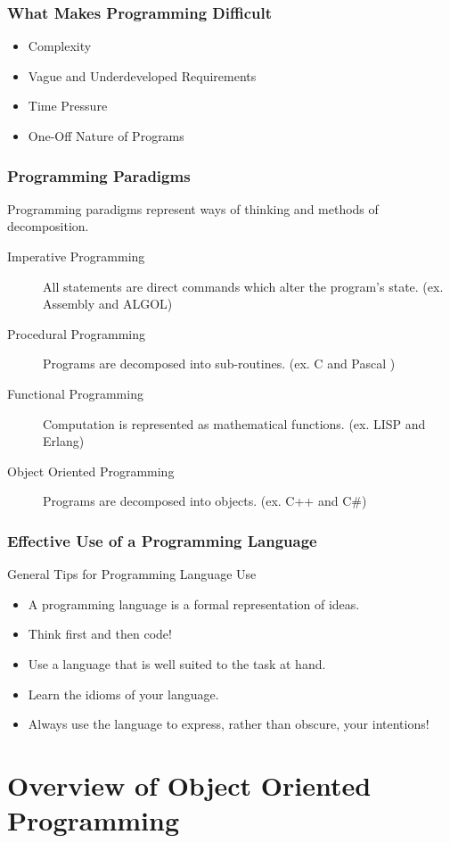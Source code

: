 \documentclass[handout]{beamer}
\begin{document}
\begin{frame}
   \frametitle{What Makes Programming Difficult}
   \begin{itemize}
   \item Complexity
   \item Vague and Underdeveloped Requirements
   \item Time Pressure
   \item One-Off Nature of Programs
   \end{itemize}
\end{frame}

\begin{frame}
   \frametitle{Programming Paradigms}
   Programming paradigms represent ways of thinking and methods of
   decomposition.
   \begin{description}
   \item[Imperative Programming] All statements are direct commands
     which alter the program's state.  (ex. Assembly and ALGOL)
   \item[Procedural Programming] Programs are decomposed into sub-routines.
     (ex. C and Pascal )
   \item[Functional Programming] Computation is represented as mathematical
     functions.  (ex. LISP and Erlang)
   \item[Object Oriented Programming] Programs are decomposed into objects.
     (ex. C++ and C\#)
   \end{description}
\end{frame}

\begin{frame}
   \frametitle{Effective Use of a Programming Language}
   General Tips for Programming Language Use
   \begin{itemize}
   \item<2-> A programming language is a formal representation of ideas.
   \item<3-> Think first and then code!
   \item<4-> Use a language that is well suited to the task at hand.
   \item<5-> Learn the idioms of your language.
   \item<6-> Always use the language to express, rather than obscure, 
       your intentions!
   \end{itemize}
\end{frame}

\section{Overview of Object Oriented Programming}
\end{document}
